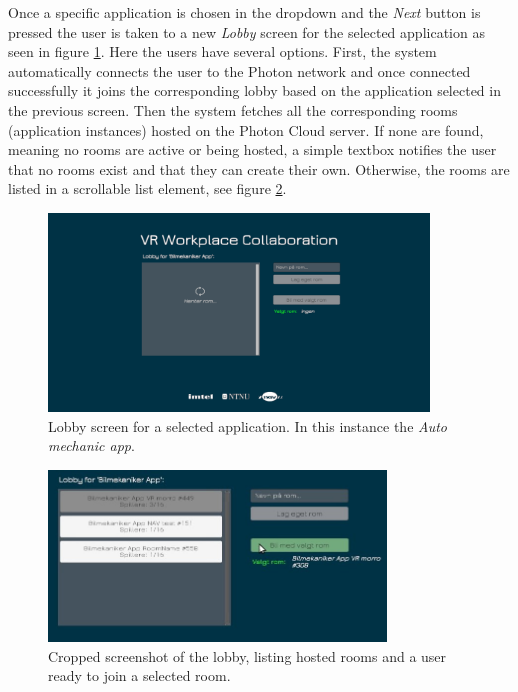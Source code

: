 Once a specific application is chosen in the dropdown and the \textit{Next} button is pressed the user is taken to a new \textit{Lobby} screen for the selected application as seen in figure \ref{fig:phase3_LobbyScene1}. Here the users have several options. First, the system automatically connects the user to the Photon network and once connected successfully it joins the corresponding lobby based on the application selected in the previous screen.    
Then the system fetches all the corresponding rooms (application instances) hosted on the Photon Cloud server. If none are found, meaning no rooms are active or being hosted, a simple textbox notifies the user that no rooms exist and that they can create their own. Otherwise, the rooms are listed in a scrollable list element, see figure \ref{fig:phase3_LobbyMultiRoomsSelectSmall}. 

\begin{figure}[H]
  \centering
   \captionsetup{width=.9\linewidth}
    \includegraphics[width=0.9\textwidth]{fig/phase_3/implementation/Lobby2Fetching.PNG}
 \caption{Lobby screen for a selected application. In this instance the \textit{Auto mechanic app}.}
\label{fig:phase3_LobbyScene1}
\end{figure}

\begin{figure}[H]
  \centering
   \captionsetup{width=.8\linewidth}
    \includegraphics[width=0.8\textwidth]{fig/phase_3/implementation/Lobby2MultiRoomsSelectedSmall.jpg}
 \caption{Cropped screenshot of the lobby, listing hosted rooms and a user ready to join a selected room.}
\label{fig:phase3_LobbyMultiRoomsSelectSmall}
\end{figure}

